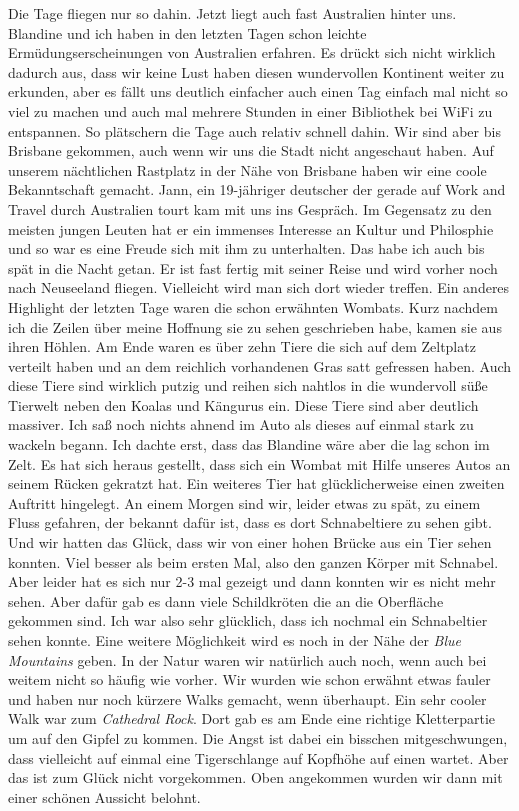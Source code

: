 \documentclass[11pt]{book}
\begin{document}
Die Tage fliegen nur so dahin. Jetzt liegt auch fast Australien hinter uns. Blandine und ich haben in den letzten Tagen schon 
leichte Ermüdungserscheinungen von Australien erfahren. Es drückt sich nicht wirklich dadurch aus, dass wir keine Lust haben 
diesen wundervollen Kontinent weiter zu erkunden, aber es fällt uns deutlich einfacher auch einen Tag einfach mal nicht so viel 
zu machen und auch mal mehrere Stunden in einer Bibliothek bei WiFi zu entspannen. So plätschern die Tage auch relativ schnell dahin.
Wir sind aber bis Brisbane gekommen, auch wenn wir uns die Stadt nicht angeschaut haben. Auf unserem nächtlichen Rastplatz in der 
Nähe von Brisbane haben wir eine coole Bekanntschaft gemacht. Jann, ein 19-jähriger deutscher der gerade auf Work and Travel 
durch Australien tourt kam mit uns ins Gespräch. Im Gegensatz zu den meisten jungen Leuten hat er ein immenses Interesse an Kultur 
und Philosphie und so war es eine Freude sich mit ihm zu unterhalten. Das habe ich auch bis spät in die Nacht getan. Er ist fast 
fertig mit seiner Reise und wird vorher noch nach Neuseeland fliegen. Vielleicht wird man sich dort wieder treffen. 
Ein anderes Highlight der letzten Tage waren die schon erwähnten Wombats. Kurz nachdem ich die Zeilen über meine Hoffnung sie zu sehen 
geschrieben habe, kamen sie aus ihren Höhlen. Am Ende waren es über zehn Tiere die sich auf dem Zeltplatz verteilt haben und 
an dem reichlich vorhandenen Gras satt gefressen haben. Auch diese Tiere sind wirklich putzig und reihen sich nahtlos in die 
wundervoll süße Tierwelt neben den Koalas und Kängurus ein. Diese Tiere sind aber deutlich massiver. Ich saß noch nichts ahnend 
im Auto als dieses auf einmal stark zu wackeln begann. Ich dachte erst, dass das Blandine wäre aber die lag schon im Zelt. Es hat 
sich heraus gestellt, dass sich ein Wombat mit Hilfe unseres Autos an seinem Rücken gekratzt hat. 
Ein weiteres Tier hat glücklicherweise einen zweiten Auftritt hingelegt. An einem Morgen sind wir, leider etwas zu spät, zu einem 
Fluss gefahren, der bekannt dafür ist, dass es dort Schnabeltiere zu sehen gibt. Und wir hatten das Glück, dass wir von einer 
hohen Brücke aus ein Tier sehen konnten. Viel besser als beim ersten Mal, also den ganzen Körper mit Schnabel. Aber leider hat es 
sich nur 2-3 mal gezeigt und dann konnten wir es nicht mehr sehen. Aber dafür gab es dann viele Schildkröten die an die Oberfläche 
gekommen sind. Ich war also sehr glücklich, dass ich nochmal ein Schnabeltier sehen konnte. Eine weitere Möglichkeit wird es noch 
in der Nähe der \emph{Blue Mountains} geben. 
In der Natur waren wir natürlich auch noch, wenn auch bei weitem nicht so häufig wie vorher. Wir wurden wie schon erwähnt etwas 
fauler und haben nur noch kürzere Walks gemacht, wenn überhaupt. Ein sehr cooler Walk war zum \emph{Cathedral Rock}. Dort gab es 
am Ende eine richtige Kletterpartie um auf den Gipfel zu kommen. Die Angst ist dabei ein bisschen mitgeschwungen, dass vielleicht 
auf einmal eine Tigerschlange auf Kopfhöhe auf einen wartet. Aber das ist zum Glück nicht vorgekommen. Oben angekommen wurden 
wir dann mit einer schönen Aussicht belohnt. 
\end{document}
